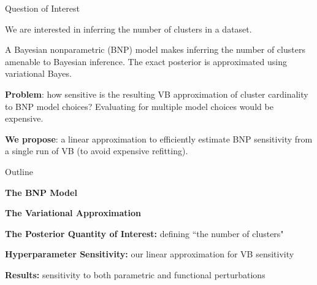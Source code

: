\documentclass[10pt]{beamer}\usepackage[]{graphicx}\usepackage[]{color}
\begin{document}
\begin{frame}{Question of Interest}

We are interested in inferring the number of clusters in a dataset.

\pause

A Bayesian nonparametric (BNP) model makes inferring the number of clusters amenable to
Bayesian inference. The exact posterior is approximated using variational Bayes. 
\pause

\textbf{Problem}: how sensitive is the resulting
VB approximation of cluster cardinality to BNP model choices? Evaluating
for multiple model choices would be expensive. 

\pause 

\textbf{We propose}: a linear approximation to efficiently
estimate BNP sensitivity from a single run of VB (to avoid
expensive refitting). 

\end{frame}

\begin{frame}{Outline}

{\bf The BNP Model}
\vspace{0.1in}

{\bf The Variational Approximation}
\vspace{0.1in}

{\bf The Posterior Quantity of Interest:} defining ``the number of clusters"
\vspace{0.1in}

{\bf Hyperparameter Sensitivity:} our linear approximation for VB sensitivity
\vspace{0.1in}

{\bf Results:} sensitivity to both parametric and functional perturbations

\end{frame}
\end{document}
